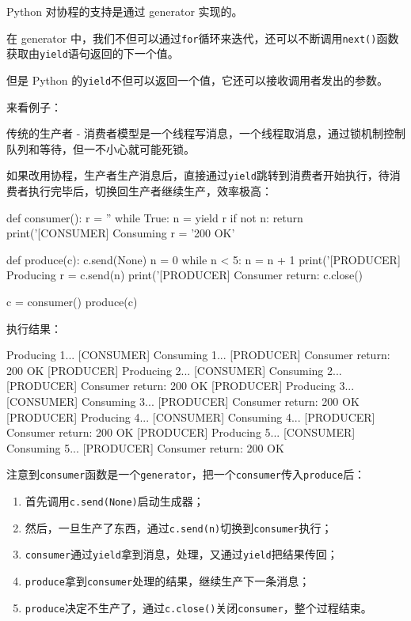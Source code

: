 Python 对协程的支持是通过 generator 实现的。

在 generator
中，我们不但可以通过\texttt{for}循环来迭代，还可以不断调用\texttt{next()}函数获取由\texttt{yield}语句返回的下一个值。

但是 Python
的\texttt{yield}不但可以返回一个值，它还可以接收调用者发出的参数。

来看例子：

传统的生产者 -
消费者模型是一个线程写消息，一个线程取消息，通过锁机制控制队列和等待，但一不小心就可能死锁。

如果改用协程，生产者生产消息后，直接通过\texttt{yield}跳转到消费者开始执行，待消费者执行完毕后，切换回生产者继续生产，效率极高：

\begin{pythoncode}
def consumer():
    r = ''
    while True:
        n = yield r
        if not n:
            return
        print('[CONSUMER] Consuming %
        r = '200 OK'

def produce(c):
    c.send(None)
    n = 0
    while n < 5:
        n = n + 1
        print('[PRODUCER] Producing %
        r = c.send(n)
        print('[PRODUCER] Consumer return: %
    c.close()

c = consumer()
produce(c)
\end{pythoncode}

执行结果：

\begin{pythoncode}
[PRODUCER] Producing 1...
[CONSUMER] Consuming 1...
[PRODUCER] Consumer return: 200 OK
[PRODUCER] Producing 2...
[CONSUMER] Consuming 2...
[PRODUCER] Consumer return: 200 OK
[PRODUCER] Producing 3...
[CONSUMER] Consuming 3...
[PRODUCER] Consumer return: 200 OK
[PRODUCER] Producing 4...
[CONSUMER] Consuming 4...
[PRODUCER] Consumer return: 200 OK
[PRODUCER] Producing 5...
[CONSUMER] Consuming 5...
[PRODUCER] Consumer return: 200 OK
\end{pythoncode}

注意到\texttt{consumer}函数是一个\texttt{generator}，把一个\texttt{consumer}传入\texttt{produce}后：

\begin{enumerate}
\def\labelenumi{\arabic{enumi}.}
\item
  首先调用\texttt{c.send(None)}启动生成器；
\item
  然后，一旦生产了东西，通过\texttt{c.send(n)}切换到\texttt{consumer}执行；
\item
  \texttt{consumer}通过\texttt{yield}拿到消息，处理，又通过\texttt{yield}把结果传回；
\item
  \texttt{produce}拿到\texttt{consumer}处理的结果，继续生产下一条消息；
\item
  \texttt{produce}决定不生产了，通过\texttt{c.close()}关闭\texttt{consumer}，整个过程结束。
\end{enumerate}

